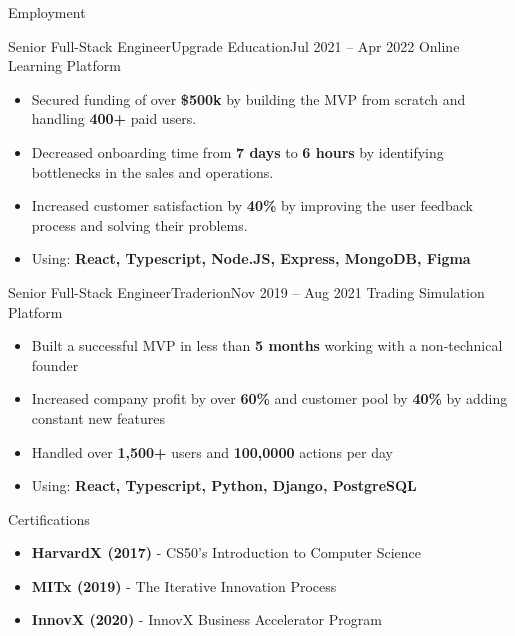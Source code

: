 \documentclass[]{mcdowellcv}
\begin{document}
\begin{cvsection}{Employment}
		\begin{cvsubsection}{Senior Full-Stack Engineer}{Upgrade Education}{Jul 2021 -- Apr 2022}
			Online Learning Platform
			\begin{itemize}
				\item Secured funding of over \textbf{\$500k} by building the MVP from scratch and handling \textbf{400+} paid users.
				\item Decreased onboarding time from \textbf{7 days} to \textbf{6 hours} by identifying bottlenecks in the sales and operations.
				\item Increased customer satisfaction by \textbf{40\%} by improving the user feedback process and solving their problems.
				\item Using: \textbf{React, Typescript, Node.JS, Express, MongoDB, Figma}
			\end{itemize}
		\end{cvsubsection}

		\begin{cvsubsection}{Senior Full-Stack Engineer}{Traderion}{Nov 2019 -- Aug 2021}
			Trading Simulation Platform
			\begin{itemize}
				\item Built a successful MVP in less than \textbf{5 months} working with a non-technical founder
				\item Increased company profit by over \textbf{60\%} and customer pool by \textbf{40\%} by adding constant new features
				\item Handled over \textbf{1,500+} users and \textbf{100,0000} actions per day
				\item Using: \textbf{React, Typescript, Python, Django, PostgreSQL}
			\end{itemize}
		\end{cvsubsection}
	\end{cvsection}
	
	\begin{cvsection}{Certifications}
		\begin{cvsubsection}{}{}{}	
			\begin{itemize}
				\item \textbf{HarvardX (2017)} - CS50's Introduction to Computer Science
				\item \textbf{MITx (2019)} - The Iterative Innovation Process
				\item \textbf{InnovX (2020)} - InnovX Business Accelerator Program
			\end{itemize}
		\end{cvsubsection}
	\end{cvsection}
	
\end{document}
